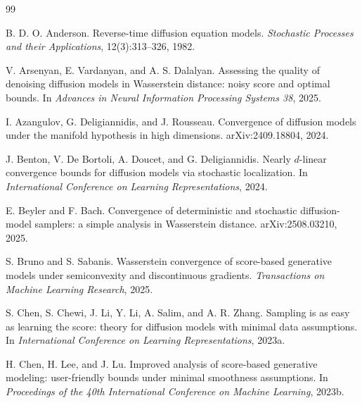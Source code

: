 \documentclass[11pt]{article}
\theoremstyle{definition}
\begin{document}
\begin{thebibliography}{99}

B. D. O. Anderson.
\newblock Reverse-time diffusion equation models.
\newblock \emph{Stochastic Processes and their Applications}, 12(3):313--326, 1982.

V. Arsenyan, E. Vardanyan, and A. S. Dalalyan.
\newblock Assessing the quality of denoising diffusion models in Wasserstein distance: noisy score and optimal bounds.
\newblock In \emph{Advances in Neural Information Processing Systems 38}, 2025.

I. Azangulov, G. Deligiannidis, and J. Rousseau.
\newblock Convergence of diffusion models under the manifold hypothesis in high dimensions.
\newblock arXiv:2409.18804, 2024.

J. Benton, V. De Bortoli, A. Doucet, and G. Deligiannidis.
\newblock Nearly $d$-linear convergence bounds for diffusion models via stochastic localization.
\newblock In \emph{International Conference on Learning Representations}, 2024.

E. Beyler and F. Bach.
\newblock Convergence of deterministic and stochastic diffusion-model samplers: a simple analysis in Wasserstein distance.
\newblock arXiv:2508.03210, 2025.

S. Bruno and S. Sabanis.
\newblock Wasserstein convergence of score-based generative models under semiconvexity and discontinuous gradients.
\newblock \emph{Transactions on Machine Learning Research}, 2025.

S. Chen, S. Chewi, J. Li, Y. Li, A. Salim, and A. R. Zhang.
\newblock Sampling is as easy as learning the score: theory for diffusion models with minimal data assumptions.
\newblock In \emph{International Conference on Learning Representations}, 2023a.

H. Chen, H. Lee, and J. Lu.
\newblock Improved analysis of score-based generative modeling: user-friendly bounds under minimal smoothness assumptions.
\newblock In \emph{Proceedings of the 40th International Conference on Machine Learning}, 2023b.


\end{thebibliography}
\end{document}
